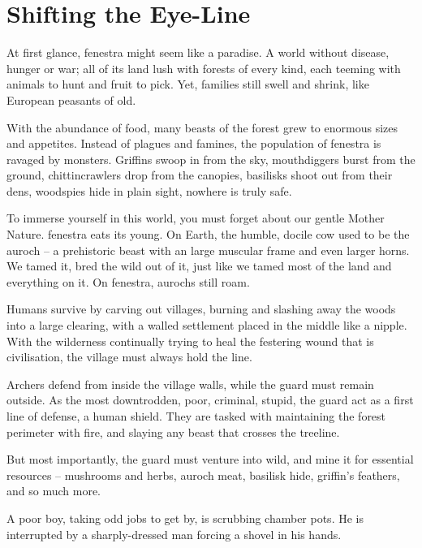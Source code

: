 \section{Shifting the Eye-Line}

\begin{multicols}{2}

\noindent
At first glance, \gls{fenestra} might seem like a paradise.
A world without disease, hunger or war; all of its land lush with forests of every kind, each teeming with animals to hunt and fruit to pick.
Yet, families still swell and shrink, like European peasants of old.

With the abundance of food, many beasts of the forest grew to enormous sizes and appetites.
Instead of plagues and famines, the population of \gls{fenestra} is ravaged by monsters.
Griffins swoop in from the sky, mouthdiggers burst from the ground, chittincrawlers drop from the canopies, basilisks shoot out from their dens, woodspies hide in plain sight, nowhere is truly safe.

To immerse yourself in this world, you must forget about our gentle Mother Nature.
\Gls{fenestra} eats its young.
On Earth, the humble, docile cow used to be the auroch -- a prehistoric beast with an large muscular frame and even larger horns.
We tamed it, bred the wild out of it, just like we tamed most of the land and everything on it.
On \gls{fenestra}, aurochs still roam.

Humans survive by carving out \glspl{village}, burning and slashing away the woods into a large clearing, with a walled settlement placed in the middle like a nipple.
With the wilderness continually trying to heal the festering wound that is civilisation, the \gls{village} must always hold the line.

Archers defend from inside the \gls{village} walls, while the \gls{guard} must remain outside.
As the most downtrodden, poor, criminal, stupid, the \gls{guard} act as a first line of defense, a human shield.
They are tasked with maintaining the forest perimeter with fire, and slaying any beast that crosses the treeline.

But most importantly, the \gls{guard} must venture into wild, and mine it for essential resources -- mushrooms and herbs, auroch meat, basilisk hide, griffin's feathers, and so much more.

\begin{exampletext}
  A poor boy, taking odd jobs to get by, is scrubbing chamber pots.
  He is interrupted by a sharply-dressed man forcing a shovel in his hands.


\end{exampletext}
\end{multicols}
